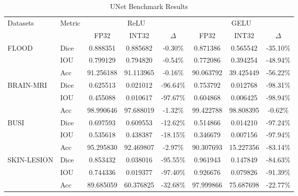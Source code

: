 \documentclass{article}
\begin{document}
\begin{table}[ht]
\centering
\caption{UNet Benchmark Results}
\begin{tabular}{|l|l|c|c|c|c|c|c|}
\hline
\multirow{2}{*}{Datasets} & \multirow{2}{*}{Metric} & \multicolumn{3}{c|}{ReLU} & \multicolumn{3}{c|}{GELU} \\
\cline{3-8}
& & FP32 & INT32 & $\Delta$ & FP32 & INT32 & $\Delta$ \\
\hline
FLOOD & Dice & 0.888351 & 0.885682 & -0.30\% & 0.871386 & 0.565542 & -35.10\% \\
 & IOU & 0.799129 & 0.794820 & -0.54\% & 0.772086 & 0.394254 & -48.94\% \\
 & Acc & 91.256188 & 91.113965 & -0.16\% & 90.063792 & 39.425449 & -56.22\% \\
\hline
BRAIN-MRI & Dice & 0.625513 & 0.021012 & -96.64\% & 0.753792 & 0.012768 & -98.31\% \\
 & IOU & 0.455088 & 0.010617 & -97.67\% & 0.604868 & 0.006425 & -98.94\% \\
 & Acc & 98.990646 & 97.688019 & -1.32\% & 99.422788 & 98.808395 & -0.62\% \\
\hline
BUSI & Dice & 0.697593 & 0.609553 & -12.62\% & 0.514866 & 0.014210 & -97.24\% \\
 & IOU & 0.535618 & 0.438387 & -18.15\% & 0.346679 & 0.007156 & -97.94\% \\
 & Acc & 95.295830 & 92.469807 & -2.97\% & 90.307693 & 15.227356 & -83.14\% \\
\hline
SKIN-LESION & Dice & 0.853432 & 0.038016 & -95.55\% & 0.961943 & 0.147849 & -84.63\% \\
 & IOU & 0.744336 & 0.019377 & -97.40\% & 0.926676 & 0.079826 & -91.39\% \\
 & Acc & 89.685059 & 60.376825 & -32.68\% & 97.999866 & 75.687698 & -22.77\% \\
\hline
\end{tabular}
\end{table}
\end{document}
